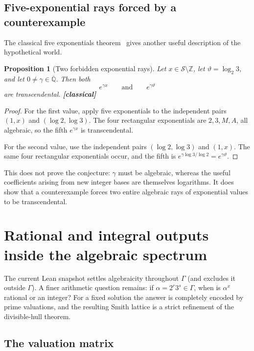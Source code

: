 \documentclass[11pt,oneside]{article}
\newtheorem{proposition}[theorem]{Proposition}
\theoremstyle{definition}
\theoremstyle{remark}
\newcommand{\Z}{\mathbb Z}
\newcommand{\Qbar}{\overline{\mathbb Q}}
\newcommand{\Sol}{\mathcal S}
\newcommand{\statusclassical}{\textcolor{MutedGray}{\textbf{[classical]}}}
\begin{document}
\subsection{Five-exponential rays forced by a counterexample}

The classical five exponentials theorem~\cite{Waldschmidt2005} gives another useful description of the hypothetical
world.

\begin{proposition}[Two forbidden exponential rays]\label{prop:five-rays}
Let $x\in\Sol\setminus\Z$, let $\vartheta=\log_2 3$, and let
$0\ne\gamma\in\Qbar$.  Then both
\[
  e^{\gamma x}
  \qquad\text{and}\qquad
  e^{\gamma\vartheta}
\]
are transcendental.  \statusclassical
\end{proposition}

\begin{proof}
For the first value, apply five exponentials to the independent pairs $(1,x)$ and
$(\log2,\log3)$.  The four rectangular exponentials are $2,3,M,A$, all algebraic, so the fifth
$e^{\gamma x}$ is transcendental.

For the second value, use the independent pairs $(\log2,\log3)$ and $(1,x)$.  The same four
rectangular exponentials occur, and the fifth is
$e^{\gamma\log3/\log2}=e^{\gamma\vartheta}$.
\end{proof}

This does not prove the conjecture: $\gamma$ must be algebraic, whereas the useful
coefficients arising from new integer bases are themselves logarithms.  It does show that a
counterexample forces two entire algebraic rays of exponential values to be transcendental.

\section{Rational and integral outputs inside the algebraic spectrum}\label{sec:valuation-spectrum}

The current Lean snapshot settles algebraicity throughout $\Gamma$ (and excludes it
outside $\Gamma$).  A finer arithmetic question remains: if
$\alpha=2^r3^s\in\Gamma$, when is $\alpha^x$ rational or an integer?  For a fixed solution
the answer is completely encoded by prime valuations, and the resulting Smith lattice is a
strict refinement of the divisible-hull theorem.

\subsection{The valuation matrix}
\end{document}
